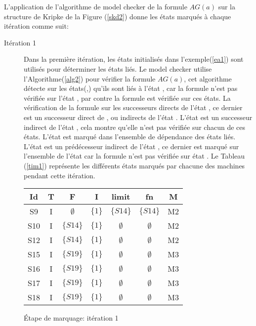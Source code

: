\begin{Exemple}\label{ea2}
	L'application de l'algorithme de model checker de la formule \textit{$AG(a)$} sur la structure de Kripke de la Figure (\ref{skd2}) donne les états marqués à chaque itération comme suit:
\begin{description}
	\item[Itération 1] Dans la première itération, les états initialisés dans l'exemple(\ref{ea1}) sont utilisés pour déterminer les états liés. Le model checker utilise l'Algorithme(\ref{alg2}) pour vérifier la formule \textit{$AG(a)$}, cet algorithme détecte sur les états(,) qu'ils sont liés à l'état , car la formule n'est pas vérifiée sur l'état , par contre la formule est vérifiée sur ces états. La vérification de la formule sur les successeurs directs de l'état , ce dernier est un successeur direct de , ou indirects de l'état . L'état  est un successeur indirect de l'état , cela montre qu'elle n'est pas vérifiée sur chacun de ces états. L'état  est marqué dans l'ensemble de dépendance des états liés. L'état  est un prédécesseur indirect de l'état , ce dernier est marqué sur l'ensemble  de l'état  car la formule n'est pas vérifiée sur état . Le Tableau (\ref{tim1}) représente les différents états marqués par chacune des machines pendant cette itération.   
\begin{tableth}
	\centering
	\begin{tabular}{|*{7}{c|}}
		\hline
		Id&		T&			F&	I&	limit&	fn&		M\\
		\hline
		S9&		I&$\emptyset$&$\{	1\}$&	$\{S14\}$&	$\{S14\}$&	M2\\
		\hline
		S10&	I&	$\{S14\}$&$\{	1\}$&$\emptyset$& $\emptyset$ &M2\\
		\hline
		S12&	I&	$\{S14\}$&$\{	1\}$&$\emptyset$&$\emptyset$ &	M2\\
		\hline
		S15&	I&	$\{S19\}$&$\{	1\}$&$\emptyset$&$\emptyset$ &	M3\\
		\hline
		S16&	I&	$\{S19\}$&$\{	1\}$&$\emptyset$&$\emptyset$ &	M3\\
		\hline
		S17&	I&	$\{S19\}$&$\{	1\}$&$\emptyset$&$\emptyset$ &	M3\\
		\hline
		S18&	I&	$\{S19\}$&$\{	1\}$&$\emptyset$&$\emptyset$ &	M3\\		
		\hline
	\end{tabular}
	\caption{Étape de marquage: itération 1}\label{tim1}
\end{tableth}
\\\\	

\end{description}
\end{Exemple}

